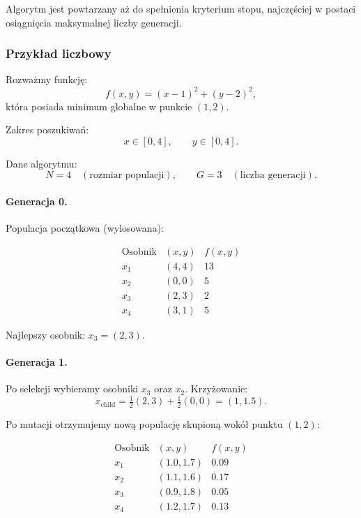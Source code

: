 \documentclass[10pt,a4paper]{article}
\begin{document}
Algorytm jest powtarzany aż do spełnienia kryterium stopu, najczęściej
w postaci osiągnięcia maksymalnej liczby generacji.



\subsubsection{Przykład liczbowy}

Rozważmy funkcję:
\[
f(x,y) = (x-1)^2 + (y-2)^2,
\]
która posiada minimum globalne w punkcie $(1,2)$.

Zakres poszukiwań:
\[
x \in [0,4], \qquad y \in [0,4].
\]

Dane algorytmu:
\[
N=4 \quad (\text{rozmiar populacji}), \qquad
G=3 \quad (\text{liczba generacji}).
\]



\paragraph{Generacja 0.}

Populacja początkowa (wylosowana):

\[
\begin{array}{c|c|c}
\text{Osobnik} & (x,y) & f(x,y) \\ \hline
x_1 & (4,4) & 13 \\
x_2 & (0,0) & 5 \\
x_3 & (2,3) & 2 \\
x_4 & (3,1) & 5
\end{array}
\]

Najlepszy osobnik: $x_3=(2,3)$.



\paragraph{Generacja 1.}

Po selekcji wybieramy osobniki $x_3$ oraz $x_2$.
Krzyżowanie:
\[
x_{\text{child}} = \tfrac{1}{2}(2,3) + \tfrac{1}{2}(0,0) = (1,1.5).
\]

Po mutacji otrzymujemy nową populację skupioną wokół punktu $(1,2)$:

\[
\begin{array}{c|c|c}
\text{Osobnik} & (x,y) & f(x,y) \\ \hline
x_1 & (1.0,1.7) & 0.09 \\
x_2 & (1.1,1.6) & 0.17 \\
x_3 & (0.9,1.8) & 0.05 \\
x_4 & (1.2,1.7) & 0.13
\end{array}
\]
\end{document}
